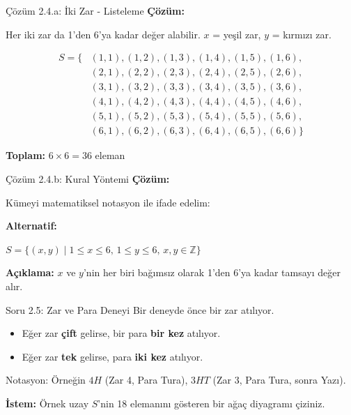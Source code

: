\documentclass[light]{lutbeamer}
\begin{document}
\begin{frame}{Çözüm 2.4.a: İki Zar - Listeleme}
    \color{blue}
    \textbf{Çözüm:}
    
    Her iki zar da 1'den 6'ya kadar değer alabilir. $x$ = yeşil zar, $y$ = kırmızı zar.
    
    \vspace{0.2cm}
    \footnotesize
    \begin{align*}
    S = \{ &(1,1), (1,2), (1,3), (1,4), (1,5), (1,6), \\
           &(2,1), (2,2), (2,3), (2,4), (2,5), (2,6), \\
           &(3,1), (3,2), (3,3), (3,4), (3,5), (3,6), \\
           &(4,1), (4,2), (4,3), (4,4), (4,5), (4,6), \\
           &(5,1), (5,2), (5,3), (5,4), (5,5), (5,6), \\
           &(6,1), (6,2), (6,3), (6,4), (6,5), (6,6) \}
    \end{align*}
    
    \textbf{Toplam:} $6 \times 6 = 36$ eleman
\end{frame}

\begin{frame}{Çözüm 2.4.b: Kural Yöntemi}
    \color{blue}
    \textbf{Çözüm:}
    
    Kümeyi matematiksel notasyon ile ifade edelim:
    
    \vspace{0.5cm}
    \begin{center}
    \end{center}
    
    \vspace{0.5cm}
    \textbf{Alternatif:}
    \begin{center}
    $S = \{(x,y) \mid 1 \leq x \leq 6, \, 1 \leq y \leq 6, \, x,y \in \mathbb{Z}\}$
    \end{center}
    
    \vspace{0.3cm}
    \textbf{Açıklama:} $x$ ve $y$'nin her biri bağımsız olarak 1'den 6'ya kadar tamsayı değer alır.
\end{frame}

\begin{frame}{Soru 2.5: Zar ve Para Deneyi}
    Bir deneyde önce bir zar atılıyor.
    \begin{itemize}
        \item Eğer zar \textbf{çift} gelirse, bir para \textbf{bir kez} atılıyor.
        \item Eğer zar \textbf{tek} gelirse, para \textbf{iki kez} atılıyor.
    \end{itemize}
    Notasyon: Örneğin $4H$ (Zar 4, Para Tura), $3HT$ (Zar 3, Para Tura, sonra Yazı).
    
    \textbf{İstem:} Örnek uzay $S$'nin 18 elemanını gösteren bir ağaç diyagramı çiziniz.
\end{frame}
\end{document}
